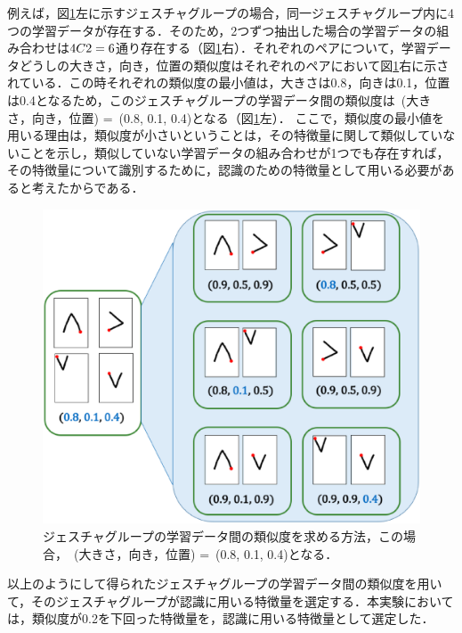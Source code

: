 例えば，図\ref{fig:group_similarity}左に示すジェスチャグループの場合，同一ジェスチャグループ内に4つの学習データが存在する．そのため，2つずつ抽出した場合の学習データの組み合わせは${\scriptsize 4}C{\scriptsize 2}=6$通り存在する（図\ref{fig:group_similarity}右）．それぞれのペアについて，学習データどうしの大きさ，向き，位置の類似度はそれぞれのペアにおいて図\ref{fig:group_similarity}右に示されている．この時それぞれの類似度の最小値は，大きさは0.8，向きは0.1，位置は0.4となるため，このジェスチャグループの学習データ間の類似度は~(大きさ，向き，位置) =~(0.8, 0.1, 0.4)となる（図\ref{fig:group_similarity}左）．
ここで，類似度の最小値を用いる理由は，類似度が小さいということは，その特徴量に関して類似していないことを示し，類似していない学習データの組み合わせが1つでも存在すれば，その特徴量について識別するために，認識のための特徴量として用いる必要があると考えたからである．

\begin{figure} [h!]
	\begin{center}
		\includegraphics [width=0.7\hsize ]{img/group_similarity.eps}
	\end{center}
	\caption{ジェスチャグループの学習データ間の類似度を求める方法，この場合，~(大きさ，向き，位置) =~(0.8, 0.1, 0.4)となる．}
	\label{fig:group_similarity}
\end{figure}

以上のようにして得られたジェスチャグループの学習データ間の類似度を用いて，そのジェスチャグループが認識に用いる特徴量を選定する．本実験においては，類似度が0.2を下回った特徴量を，認識に用いる特徴量として選定した．



